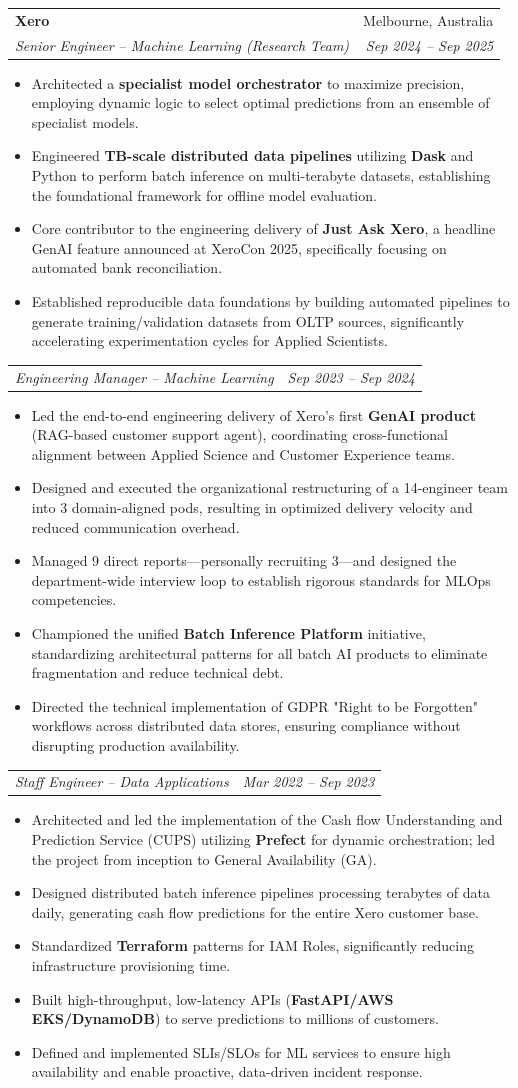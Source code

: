 \documentclass[letterpaper,11pt]{article}
\makeatletter
\newcommand{\resumeItem}[1]{
  \item\small{
    {#1 \vspace{-2pt}}
  }
}
\newcommand{\resumeSubheading}[4]{
  \vspace{-1pt}\item
    \begin{tabular*}{0.97\textwidth}[t]{l@{\extracolsep{\fill}}r}
      \textbf{#1} & #2 \\
      \textit{\small#3} & \textit{\small #4} \\
    \end{tabular*}\vspace{-7pt}
}
\newcommand{\resumeSubSubheading}[2]{
    \item
    \begin{tabular*}{0.97\textwidth}{l@{\extracolsep{\fill}}r}
      \textit{\small#1} & \textit{\small #2} \\
    \end{tabular*}\vspace{-7pt}
}
\newcommand{\resumeItemListStart}{\begin{itemize}}
\newcommand{\resumeItemListEnd}{\end{itemize}\vspace{-5pt}}
\makeatother
\begin{document}
    \resumeSubheading
      {Xero}{Melbourne, Australia}
      {Senior Engineer -- Machine Learning (Research Team)}{Sep 2024 -- Sep 2025}
      \resumeItemListStart
        \resumeItem{Architected a \textbf{specialist model orchestrator} to maximize precision, employing dynamic logic to select optimal predictions from an ensemble of specialist models.}
        \resumeItem{Engineered \textbf{TB-scale distributed data pipelines} utilizing \textbf{Dask} and Python to perform batch inference on multi-terabyte datasets, establishing the foundational framework for offline model evaluation.}
        \resumeItem{Core contributor to the engineering delivery of \textbf{Just Ask Xero}, a headline GenAI feature announced at XeroCon 2025, specifically focusing on automated bank reconciliation.}
        \resumeItem{Established reproducible data foundations by building automated pipelines to generate training/validation datasets from OLTP sources, significantly accelerating experimentation cycles for Applied Scientists.}
      \resumeItemListEnd

    \resumeSubSubheading
      {Engineering Manager -- Machine Learning}{Sep 2023 -- Sep 2024}
      \resumeItemListStart
        \resumeItem{Led the end-to-end engineering delivery of Xero’s first \textbf{GenAI product} (RAG-based customer support agent), coordinating cross-functional alignment between Applied Science and Customer Experience teams.}
        \resumeItem{Designed and executed the organizational restructuring of a 14-engineer team into 3 domain-aligned pods, resulting in optimized delivery velocity and reduced communication overhead.}
        \resumeItem{Managed 9 direct reports---personally recruiting 3---and designed the department-wide interview loop to establish rigorous standards for MLOps competencies.}
        \resumeItem{Championed the unified \textbf{Batch Inference Platform} initiative, standardizing architectural patterns for all batch AI products to eliminate fragmentation and reduce technical debt.}
        \resumeItem{Directed the technical implementation of GDPR "Right to be Forgotten" workflows across distributed data stores, ensuring compliance without disrupting production availability.}
      \resumeItemListEnd

    \resumeSubSubheading
      {Staff Engineer -- Data Applications}{Mar 2022 -- Sep 2023}
      \resumeItemListStart
        \resumeItem{Architected and led the implementation of the Cash flow Understanding and Prediction Service (CUPS) utilizing \textbf{Prefect} for dynamic orchestration; led the project from inception to General Availability (GA).}
        \resumeItem{Designed distributed batch inference pipelines processing terabytes of data daily, generating cash flow predictions for the entire Xero customer base.}
        \resumeItem{Standardized \textbf{Terraform} patterns for IAM Roles, significantly reducing infrastructure provisioning time.}
        \resumeItem{Built high-throughput, low-latency APIs (\textbf{FastAPI/AWS EKS/DynamoDB}) to serve predictions to millions of customers.}
        \resumeItem{Defined and implemented SLIs/SLOs for ML services to ensure high availability and enable proactive, data-driven incident response.}
      \resumeItemListEnd
\end{document}
